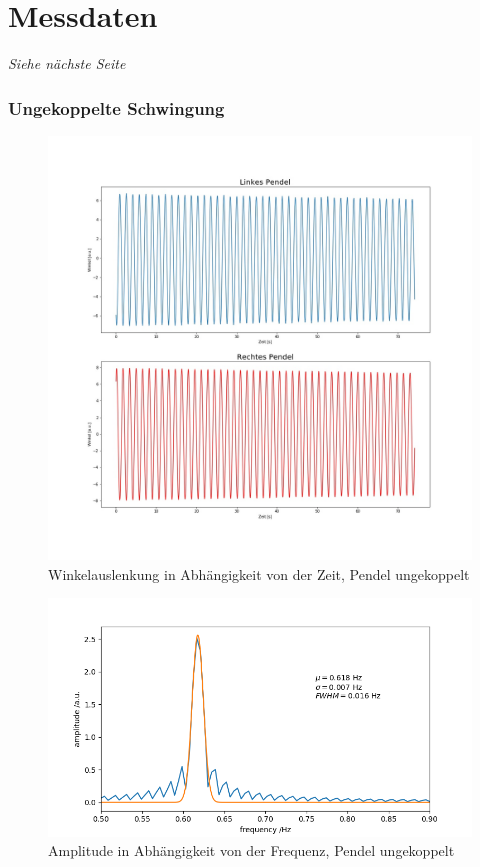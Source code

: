 \section{Messdaten}
\textit{Siehe nächste Seite}

\subsubsection{Ungekoppelte Schwingung}
\begin{figure}[H]
	\centering
	\includegraphics[height = 0.5 \textheight]{figures/211-3.jpeg}
	\caption{Winkelauslenkung in Abhängigkeit von der Zeit, Pendel ungekoppelt}
\end{figure}
\begin{figure}[H]
	\centering
	\includegraphics[height = 0.25 \textheight]{figures/211-4.jpeg}
	\caption{Amplitude in Abhängigkeit von der Frequenz, Pendel ungekoppelt}
\end{figure}

